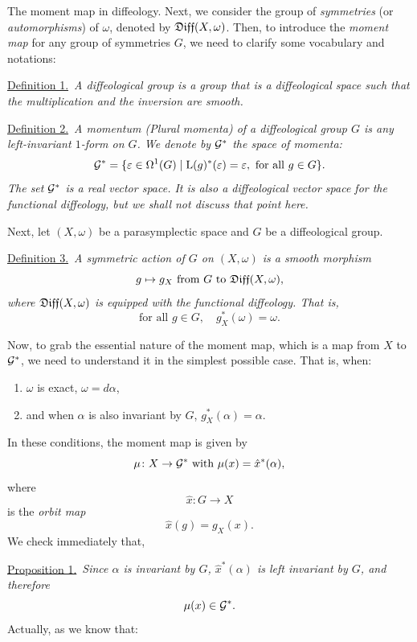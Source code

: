 \begin{Article}{The moment map in diffeology.}{}
  Next,
  we consider the group of \emph{symmetries} (or \emph{automorphisms}) of $\omega$,
  denoted by $\mathfrak{Diff}(X,\omega)$.
  Then,
  to introduce the \emph{moment map} for any group of symmetries $G$,
  we need to clarify some vocabulary and notations:
  
  \uline{Definition 1.}~{\itshape A diffeological group is a group that is a diffeological space such that the multiplication and the inversion are smooth.}
  
  \uline{Definition 2.}~{\itshape A \emph{momentum} (Plural \emph{momenta}) of a diffeological group $G$ is any left-invariant $1$-form on $G$.
  We denote by $\mathcal{G}^*$ the space of \emph{momenta}:
  $$%
    \cG^* = \{\varepsilon \in \DForms^1(G) \mid \mathrm{L}(g)^*(\varepsilon) = \varepsilon, \mbox{ for all } g \in G \}.
    $$%
  The set $\mathcal{G}^*$ is a real vector space.
  It is also a diffeological vector space for the functional diffeology,
  but we shall not discuss that point here.
  }
  
  Next,
  let $(X,\omega)$ be a parasymplectic space and  $G$ be a diffeological group.
  
  \uline{Definition 3.}~{\itshape A \emph{symmetric action} of $G$ on $(X,\omega)$ is a smooth morphism
  $$%
    g \mapsto g_X \text{ from $G$ to $\Diff(X,\omega)$},
    $$%
  where $\mathfrak{Diff}(X,\omega)$ is equipped with the functional diffeology.
  That is,
  $$%
    \text{for all $g\in G$}, \quad g_X^*(\omega)=\omega.
    $$%
  }
  
  Now,
  to grab the essential nature of the moment map,
  which is a map from $X$ to $\mathcal{G}^*$,
  we need to understand it in the simplest possible case.
  That is,
  when:
  
  \begin{enumerate}
    \item $\omega$ is exact,
    $\omega = d\alpha$,
    \item and when $\alpha$ is also invariant by $G$,
    $g_X^*(\alpha) = \alpha$.
  \end{enumerate}
  
  In these conditions,
  the moment map is given by
  $$%
    \mu \colon X \to \cG^*
    \SpacedText{with}
    \mu(x) = \hat x^*(\alpha),
    $$%
  where
  $$%
    \hat x \colon G \to X
    $$%
  is the \emph{orbit map}
  $$%
    \hat x (g)= g_X(x).
    $$%
  We check immediately that,
  
  \uline{Proposition 1.}~{\itshape Since $\alpha$ is invariant by $G$,
  $\hat x^*(\alpha)$ is left invariant by $G$,
  and therefore
  $$%
    \mu(x) \in \cG^*.
    $$}
  Actually,
  as we know that:
  

\end{Article}
